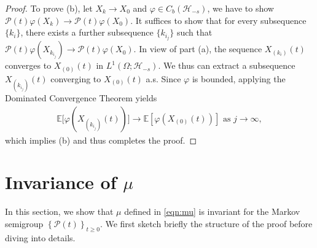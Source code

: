 \documentclass[11pt]{amsart}
\theoremstyle{definition}
\renewcommand{\H}{\mathcal{H}}
\newcommand{\PMarkov}{\mathcal{P}}
\newcommand{\E}[1]{\mathbb{E}\left[#1\right]}
\newcommand{\Enone}[1]{\mathbb{E}#1}
\newcommand{\Hs}{\mathcal{H}_{-s}}
\theoremstyle{definition}
\theoremstyle{plain}
\numberwithin{equation}{section}
\begin{document}
\begin{proof}
To prove (b), let $X_k\to X_0$ and $\varphi\in C_b\left(\H_{-s}\right)$, we have to show $\PMarkov(t)\varphi(X_k)\to\PMarkov(t)\varphi(X_0)$. It suffices to show that for every subsequence $\{k_i\}$, there exists a further subsequence $\{k_{i_j}\}$ such that $\PMarkov(t)\varphi(X_{k_{i_j}})\to\PMarkov(t)\varphi(X_0)$. In view of part (a), the sequence $X_{(k_i)}(t)$ converges to $X_{(0)}(t)$ in $L^1(\Omega;\Hs)$. We thus can extract a subsequence $X_{(k_{i_j})}(t)$ converging to $X_{(0)}(t)$ a.s. Since $\varphi$ is bounded, applying the Dominated Convergence Theorem yields
\begin{align*}
\Enone \big[\varphi(X_{(k_{i_j})}(t))\big]\to \E{\varphi(X_{(0)}(t))} \text{ as } j\rightarrow \infty, 
\end{align*}
which implies (b) and thus completes the proof.
\end{proof}


\section{Invariance of $\mu$} \label{sec:invariant-exist}
In this section, we show that $\mu$ defined in \eqref{eqn:mu} is invariant for the Markov semigroup $\left\{\PMarkov(t)\right\}_{t\geq 0}$.  We first sketch briefly the structure of the proof before diving into details. 
\end{document}
